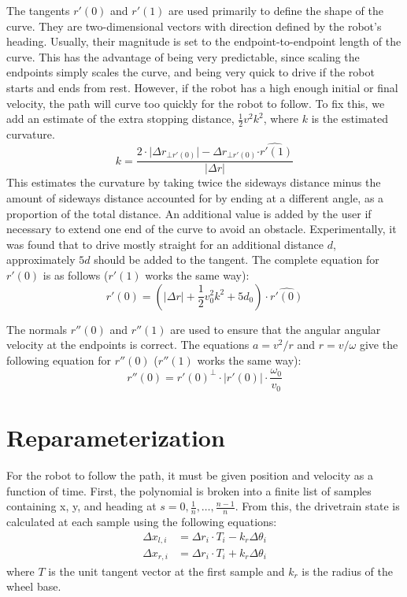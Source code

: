 \documentclass{article}
\begin{document}
The tangents $r'(0)$ and $r'(1)$ are used primarily to define the shape of the curve.
They are two-dimensional vectors with direction defined by the robot's heading. Usually, their magnitude 
is set to the endpoint-to-endpoint length of the curve. This has the advantage of being very predictable,
since scaling the endpoints simply scales the curve, and being very quick to drive if the robot starts and
ends from rest. However, if the robot has a high enough initial or final velocity, the path will curve too
quickly for the robot to follow. To fix this, we add an estimate of the extra stopping distance, $\frac{1}{2}v^2k^2$,
where $k$ is the estimated curvature.
\begin{equation}
k = \frac{2 \cdot \lvert \Delta r_{\bot r'(0)} \rvert - \Delta r_{\bot r'(0)} \widehat{\cdot r'(1)}}{\lvert \Delta r \rvert}
\end{equation}
This estimates the curvature by taking twice the sideways distance minus the amount of sideways distance accounted for
by ending at a different angle, as a proportion of the total distance. An additional value is added by the
user if necessary to extend one end of the curve to avoid an obstacle. Experimentally, it was found that to
drive mostly straight for an additional distance $d$, approximately $5d$ should be added to the tangent.
The complete equation for $r'(0)$ is as follows ($r'(1)$ works the same way):
\begin{equation}
r'(0)=(\lvert \Delta r \rvert + \frac{1}{2}v_0^2k^2 + 5d_0) \cdot \widehat{r'(0)}
\end{equation}

The normals $r''(0)$ and $r''(1)$ are used to ensure that the angular angular velocity at the endpoints is correct.
The equations $a=v^2/r$ and $r=v/\omega$ give the following equation for $r''(0)$ ($r''(1)$ works the same way):
\begin{equation}
r''(0)=r'(0)^\bot \cdot \lvert r'(0) \rvert \cdot \frac{\omega_0}{v_0}
\end{equation}

\section{Reparameterization}
For the robot to follow the path, it must be given position and velocity as a function of time. First,
the polynomial is broken into a finite list of samples containing x, y, and heading at $s=0,\frac{1}{n},\hdots,\frac{n-1}{n}$.
From this, the drivetrain state is calculated at each sample using the following equations:
\begin{align}
\Delta x_{l,i} &= \Delta r_i \cdot T_i - k_r \Delta \theta_i \\
\Delta x_{r,i} &= \Delta r_i \cdot T_i + k_r \Delta \theta_i
\end{align}
where $T$ is the unit tangent vector at the first sample and $k_r$ is the radius of the wheel base.
\end{document}
